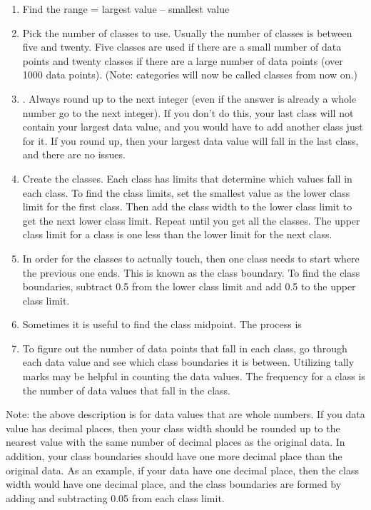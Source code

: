 \documentclass[]{book}
\begin{document}
\begin{enumerate}
\def\labelenumi{\arabic{enumi}.}
\item
  Find the range = largest value -- smallest value
\item
  Pick the number of classes to use. Usually the number of classes is between five and twenty. Five classes are used if there are a small number of data points and twenty classes if there are a large number of data points (over 1000 data points). (Note: categories will now be called classes from now on.)
\item
  . Always round up to the next integer (even if the answer is already a whole number go to the next integer). If you don't do this, your last class will not contain your largest data value, and you would have to add another class just for it. If you round up, then your largest data value will fall in the last class, and there are no issues.
\item
  Create the classes. Each class has limits that determine which values fall in each class. To find the class limits, set the smallest value as the lower class limit for the first class. Then add the class width to the lower class limit to get the next lower class limit. Repeat until you get all the classes. The upper class limit for a class is one less than the lower limit for the next class.
\item
  In order for the classes to actually touch, then one class needs to start where the previous one ends. This is known as the class boundary. To find the class boundaries, subtract 0.5 from the lower class limit and add 0.5 to the upper class limit.
\item
  Sometimes it is useful to find the class midpoint. The process is
\item
  To figure out the number of data points that fall in each class, go through each data value and see which class boundaries it is between. Utilizing tally marks may be helpful in counting the data values. The frequency for a class is the number of data values that fall in the class.
\end{enumerate}

Note: the above description is for data values that are whole numbers. If you data value has decimal places, then your class width should be rounded up to the nearest value with the same number of decimal places as the original data. In addition, your class boundaries should have one more decimal place than the original data. As an example, if your data have one decimal place, then the class width would have one decimal place, and the class boundaries are formed by adding and subtracting 0.05 from each class limit.
\end{document}
